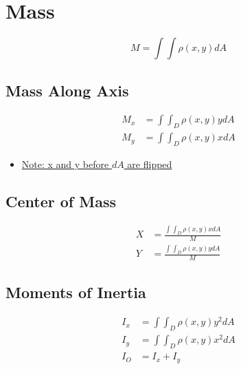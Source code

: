 \section{Mass}

  \begin{equation}
    M = \int \int \rho \left( x, y \right) dA
  \end{equation}

  \subsection{Mass Along Axis}

    \begin{align}
      M_{x} &= \int \int_{D} \rho \left( x, y \right) y dA \\
      M_{y} &= \int \int_{D} \rho \left( x, y \right) x dA
    \end{align}

    \begin{itemize}
      \item \ul{Note: x and y before $ dA $ are flipped}
    \end{itemize}

  \subsection{Center of Mass}

    \begin{align}
      X &= \frac{\int \int_{D} \rho \left( x, y \right) x dA}{M} \\
      Y &= \frac{\int \int_{D} \rho \left( x, y \right) y dA}{M}
    \end{align}

  \subsection{Moments of Inertia}

    \begin{align}
      I_{x} &= \int \int_{D} \rho \left( x, y \right) y^{2} dA \\
      I_{y} &= \int \int_{D} \rho \left( x, y \right) x^{2} dA \\
      I_{O} &= I_{x} + I_{y}
    \end{align}